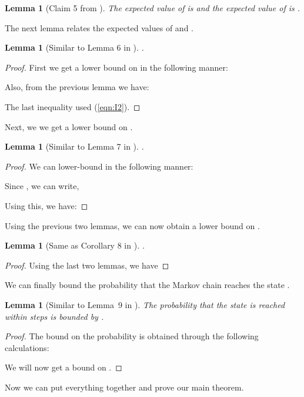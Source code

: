 \documentclass[11pt]{article}
\newtheorem{lemma}[theorem]{Lemma}
\begin{document}
\begin{lemma}[Claim 5 from \cite{br12}]
The expected value of  is  and the expected value of  is .
\end{lemma}


The next lemma relates the expected values of  and .

\begin{lemma}[Similar to Lemma 6 in \cite{br12}]
.
\end{lemma}
\begin{proof}
First we get a lower bound on  in the following manner:

Also, from the previous lemma we have:

The last inequality used (\ref{eqn:I2}).
\end{proof}

Next, we we get a lower bound on .

\begin{lemma}[Similar to Lemma 7 in \cite{br12}]
.
\end{lemma}
\begin{proof}
We can lower-bound  in the following manner:

Since , we can write,


Using this, we have:

\end{proof}

Using the previous two lemmas, we can now obtain a lower bound on .

\begin{lemma}[Same as Corollary 8 in \cite{br12}]\label{lemma:19}
.
\end{lemma}
\begin{proof}
Using the last two lemmas, we have

\end{proof}

We can finally bound the probability that the Markov chain reaches the state .

\begin{lemma}[Similar to Lemma~9 in \cite{br12}]\label{lemma:20}
The probability that the state  is reached within  steps is bounded by .
\end{lemma}
\begin{proof}
The bound on the probability is obtained through the following calculations:

We will now get a bound on .

\end{proof}

Now we can put everything together and prove our main theorem.
\end{document}

